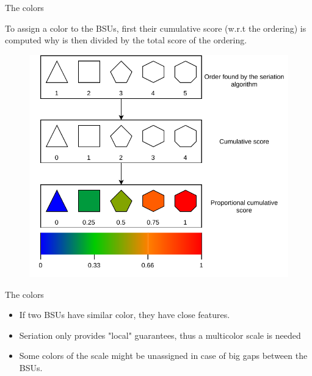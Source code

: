 \documentclass[10pt]{beamer}
\begin{document}
\begin{frame}{The colors}

    To assign a color to the BSUs, first their cumulative score (w.r.t the ordering) is computed why is then divided by the total score of the ordering.

    \begin{figure}
        \centering
        \includegraphics[scale=0.6]{figures/cumulative-score.pdf}
    \end{figure}
\end{frame}


\begin{frame}{The colors}

    \begin{itemize}
        \item If two BSUs have similar color, they have close features.
        \pause
        \item Seriation only provides "local" guarantees, thus a multicolor scale is needed
        \pause
        \item Some colors of the scale might be unassigned in case of big gaps between the BSUs.
    \end{itemize}
\end{frame}
\end{document}
